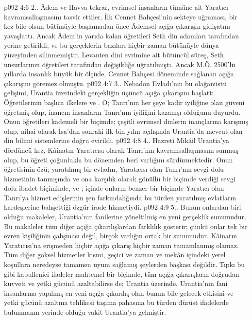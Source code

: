 \vs p092 4:6 2.\bibnobreakspace {}. Âdem ve Havva tekrar, evrimsel insanların tümüne ait Yaratıcı kavramsallaşmasını tasvir ettiler. İlk Cennet Bahçesi’nin sekteye uğraması, bir kez bile olsun bütünüyle başlamadan önce Âdemsel açığa çıkarışın gidişatını yavaşlattı. Ancak Âdem’in yarıda kalan öğretileri Seth din adamları tarafından yerine getirildi; ve bu gerçeklerin bazıları hiçbir zaman bütünüyle dünya yüzeyinden silinmemiştir. Levanten dini evrimine ait bütüncül süreç, Seth unsurlarının öğretileri tarafından değişikliğe uğratılmıştı. Ancak M.Ö. 2500’lü yıllarda insanlık büyük bir ölçüde, Cennet Bahçesi döneminde sağlanan açığa çıkarışını göremez olmuştu.
\vs p092 4:7 3.\bibnobreakspace {}. Nebadon Evladı’nın bu olağanüstü gelişimi, Urantia üzerindeki gerçekliğin üçüncü açığa çıkarışını başlattı. Öğretilerinin başlıca ilkelere  ve . O; Tanrı’nın her şeye kadir iyiliğine olan güveni öğretmiş olup, inancın insanların Tanrı’nın iyiliğini kazanışı olduğunu duyurdu. Onun öğretileri kademeli bir biçimde; çeşitli evrimsel dinlerin inançlarına karışmış olup, nihai olarak İsa’dan sonraki ilk bin yılın açılışında Urantia’da mevcut olan din bilimi sistemlerine doğru evirildi.
\vs p092 4:8 4.\bibnobreakspace {}. Hazreti Mikâil Urantia’ya dördüncü kez, Kâinatın Yaratıcısı olarak Tanrı’nın kavramsallaşmasını sunmuş olup, bu öğreti çoğunlukla bu dönemden beri varlığını sürdürmektedir. Onun öğretisinin özü; yaratılmış bir evladın, Yaratıcısı olan Tanrı’nın sevgi dolu hizmetinin tanınışında ve ona karşılık olarak gönüllü bir biçimde verdiği sevgi dolu ibadet biçiminde,  ve ; içinde onların benzer bir biçimde Yaratıcı olan Tanrı’ya hizmet edişlerinin şen farkındalığında bu türden yaratılmış evlatların kardeşlerine bahşettiği özgür irade hizmetiydi.
\vs p092 4:9 5.\bibnobreakspace {}. Bunun onlardan biri olduğu makaleler, Urantia’nın fanilerine yöneltilmiş en yeni gerçeklik sunumudur. Bu makaleler tüm diğer açığa çıkarılışlardan farklılık gösterir; çünkü onlar tek bir evren kişiliğinin çalışması değil, birçok varlığın ortak bir sunumudur. Kâinatın Yaratıcısı’na erişmeden hiçbir açığa çıkarış hiçbir zaman tamamlanmış olamaz. Tüm diğer göksel hizmetler kısmi, geçici ve zaman ve mekân içindeki yerel koşullara neredeyse tamamen uyum sağlamış şeylerden başkası değildir. Tıpkı bu gibi kabullenici ifadeler muhtemel bir biçimde, tüm açığa çıkarışların doğrudan kuvveti ve yetki gücünü azaltabilirse de; Urantia üzerinde, Urantia’nın fani insanlarına yapılmış en yeni açığa çıkarılış olan bunun bile gelecek etkisini ve yetki gücünü azaltma tehlikesi taşıma pahasına bu türden dürüst ifadelerde bulunmanın yerinde olduğu vakit Urantia’ya gelmiştir.
